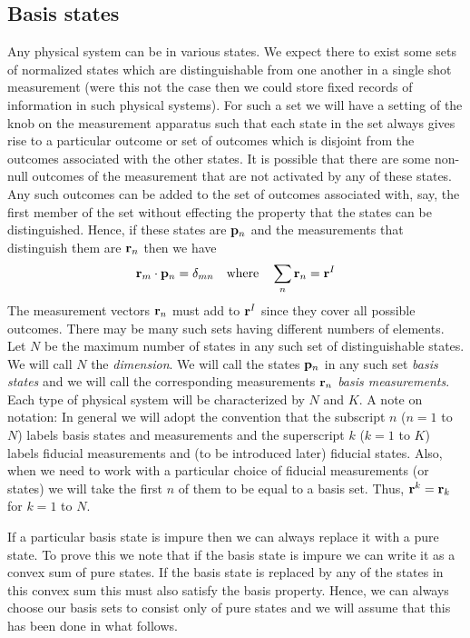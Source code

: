 \documentclass[12pt]{article}
\begin{document}
\subsection{Basis states}

Any physical system can be in various states.  We expect there to exist
some sets of normalized states which are distinguishable from one
another in a single shot measurement (were this not the case then we
could store fixed records of information in such physical systems).
For such a
set we will have a setting of the knob on the measurement apparatus such
that each state in the set always gives rise to a particular outcome or
set of outcomes which is disjoint from the outcomes associated with the other
states.  It is possible that there are some non-null outcomes of the
measurement that are not activated by any of these states.  Any such
outcomes can be added to the set of outcomes associated with, say, the
first member of the set without effecting the property that the states
can be distinguished.
Hence, if these states are ${\bf p}_n$ and the measurements that distinguish
them are ${\bf r}_n$ then we have
\begin{equation}
{\bf r}_m \cdot {\bf p}_n =\delta_{mn} \quad {\rm where}\quad
\sum_{n}{\bf r}_n = {\bf r}^I
\end{equation}
The measurement vectors ${\bf r}_n$ must add to ${\bf r}^I$ since they
cover all possible outcomes.  There may be
many such sets having different numbers of elements.  Let $N$ be the
maximum number of states in any such set of distinguishable states.  We
will call $N$ the {\it dimension}.  We will call the states ${\bf p}_n$
in any such set {\it basis states} and we will call the corresponding
measurements ${\bf r}_n$ {\it basis measurements}. Each type of physical
system will be characterized by $N$ and $K$.
A note on notation: In general we will adopt the convention that the
subscript $n$ ($n=1$ to $N$) labels basis states and measurements and
the superscript
$k$ ($k=1$ to $K$) labels fiducial measurements and (to be introduced
later) fiducial states.  Also, when we need to work
with a particular choice of fiducial measurements (or states) we will take the
first $n$ of them to be equal to a basis set. Thus, ${\bf
r}^k={\bf r}_k$ for $k=1$ to $N$.

If a particular basis state is impure then we can always replace it with
a pure state.  To prove this we note that if the basis state is impure
we can write it as a convex sum of pure states. If the basis state is
replaced by any of the states in this convex sum this must also satisfy
the basis property.  Hence, we can always choose our basis sets to
consist only of pure states and we will assume that this has been done
in what follows.
\end{document}
